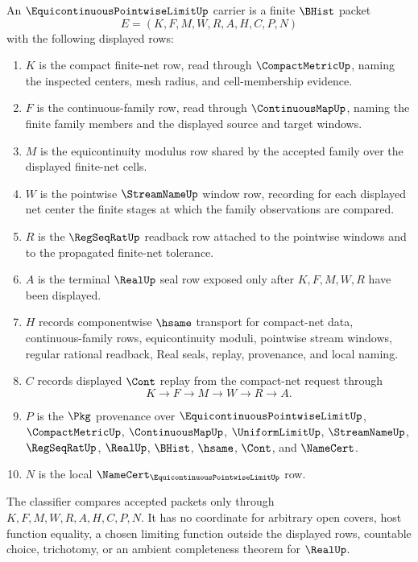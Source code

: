 \begin{definition}
\label{def:equicontinuous-pointwise-limit-carrier}
An $\EquicontinuousPointwiseLimitUp$ carrier is a finite $\BHist$ packet
$$
E=(K,F,M,W,R,A,H,C,P,N)
$$
with the following displayed rows:
\begin{enumerate}
\item $K$ is the compact finite-net row, read through $\CompactMetricUp$, naming the inspected centers, mesh radius, and cell-membership evidence.
\item $F$ is the continuous-family row, read through $\ContinuousMapUp$, naming the finite family members and the displayed source and target windows.
\item $M$ is the equicontinuity modulus row shared by the accepted family over the displayed finite-net cells.
\item $W$ is the pointwise $\StreamNameUp$ window row, recording for each displayed net center the finite stages at which the family observations are compared.
\item $R$ is the $\RegSeqRatUp$ readback row attached to the pointwise windows and to the propagated finite-net tolerance.
\item $A$ is the terminal $\RealUp$ seal row exposed only after $K,F,M,W,R$ have been displayed.
\item $H$ records componentwise $\hsame$ transport for compact-net data, continuous-family rows, equicontinuity moduli, pointwise stream windows, regular rational readback, Real seals, replay, provenance, and local naming.
\item $C$ records displayed $\Cont$ replay from the compact-net request through
$$
K\longrightarrow F\longrightarrow M\longrightarrow W\longrightarrow R\longrightarrow A .
$$
\item $P$ is the $\Pkg$ provenance over $\EquicontinuousPointwiseLimitUp$, $\CompactMetricUp$, $\ContinuousMapUp$, $\UniformLimitUp$, $\StreamNameUp$, $\RegSeqRatUp$, $\RealUp$, $\BHist$, $\hsame$, $\Cont$, and $\NameCert$.
\item $N$ is the local $\NameCert_{\EquicontinuousPointwiseLimitUp}$ row.
\end{enumerate}
The classifier compares accepted packets only through $K,F,M,W,R,A,H,C,P,N$. It has no coordinate for arbitrary open covers, host function equality, a chosen limiting function outside the displayed rows, countable choice, trichotomy, or an ambient completeness theorem for $\RealUp$.
\end{definition}

